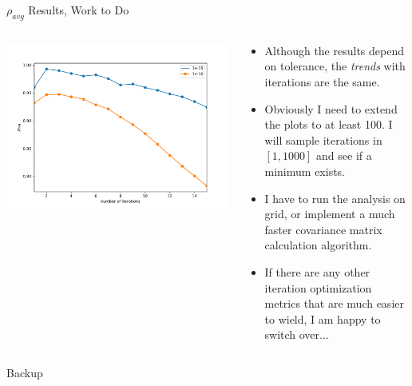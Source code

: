\documentclass[aspectratio=169]{beamer}
\begin{document}
\begin{frame}{$\rho_{avg}$ Results, Work to Do}
  \begin{columns}
    \begin{column}{.55\textwidth}
      \includegraphics[width=\textwidth]{figures/average_rho.pdf}
    \end{column}
    \begin{column}{.45\textwidth}
      \begin{itemize}
        \small
        \item Although the results depend on tolerance, the \emph{trends} with iterations are the same.
        \item Obviously I need to extend the plots to at least 100. I will sample iterations in $[1,1000]$ and see if a minimum exists.
        \item I have to run the analysis on grid, or implement a much faster covariance matrix calculation algorithm.
        \item If there are any other iteration optimization metrics that are much easier to wield, I am happy to switch over...
      \end{itemize}
    \end{column}
  \end{columns}
\end{frame}

\begin{frame}{Backup}

\end{frame}
\end{document}
